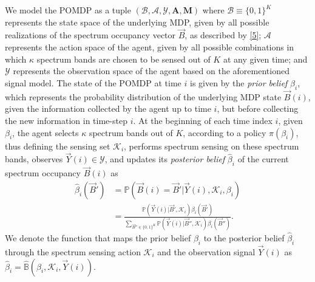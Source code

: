 \documentclass[10pt,twocolumn]{IEEEtran}
\begin{document}
We model the POMDP as a tuple $(\mathcal B,\mathcal{A},\mathcal{Y},\mathbf{A},\mathbf{M})$ where $\mathcal{B}{\equiv}\{0,1\}^K$ represents the state space of the underlying MDP, given by all possible realizations of the spectrum occupancy vector $\vec{B}$, as described by \eqref{5}; $\mathcal{A}$ represents the action space of the agent, given by all possible combinations in which $\kappa$ spectrum bands are chosen to be sensed out of $K$ at any given time; and $\mathcal{Y}$ represents the observation space of the agent based on the aforementioned signal model. The state of the POMDP at time $i$ is given by the \emph{prior belief} $\beta_i$, which represents the probability distribution of the underlying MDP state $\vec{B}(i)$, given the information collected by the agent up to time $i$, but before collecting the new information in time-step $i$. At the beginning of each time index $i$, given $\beta_i$, the agent selects $\kappa$ spectrum bands out of $K$, according to a policy $\pi(\beta_i)$, thus defining the sensing set $\mathcal K_i$, performs spectrum sensing  on these spectrum bands, observes $\vec{Y}(i){\in} \mathcal{Y}$, and updates its \emph{posterior belief} $\hat{\beta}_i$ of the current spectrum occupancy $\vec{B}(i)$ as 
\begin{align}\label{11}
\nonumber
\hat\beta_i(\vec{B}') &= \mathbb{P}(\vec{B}(i) = \vec{B}'|\vec{Y}(i), \mathcal K_i, \beta_i)\\&=
\frac{\mathbb{P}(\vec{Y}(i)|\vec{B}', \mathcal{K}_i) \beta_i(\vec{B}')}{
\sum_{\vec{B}'' {\in} \{0,1\}^K} \mathbb{P}(\vec{Y}(i)|\vec{B}'', \mathcal{K}_i) \beta_i(\vec{B}'')}.
\end{align}
We denote the function that maps the prior belief $\beta_i$ to the posterior belief $\hat\beta_i$ through the spectrum sensing action $\mathcal K_i$ and the observation signal $\vec{Y}(i)$ as $\hat\beta_i{=}\hat{\mathbb B}(\beta_i, \mathcal K_i, \vec{Y}(i))$.
\end{document}
